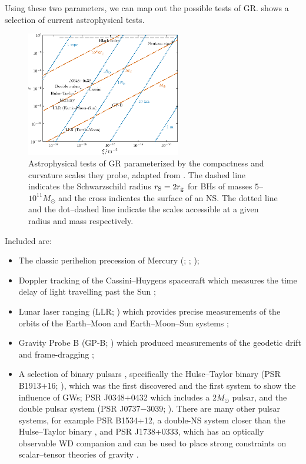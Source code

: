 Using these two parameters, we can map out the possible tests of GR.  shows a selection of current astrophysical tests.
\begin{figure}
  \centering
  \includegraphics[width=0.6\textwidth]{./images/Fig_Psaltis_plot}
    \caption{Astrophysical tests of GR parameterized by the compactness and curvature scales they probe, adapted from \citet{Psaltis2008a}. The dashed line indicates the Schwarzschild radius $r_\mathrm{S} = 2 r_\mathrm{g}$ for BHs of masses $5$--$10^{11} M_\odot$ and the cross indicates the surface of an NS. The dotted line and the dot--dashed line indicate the scales accessible at a given radius and mass respectively.}  
    \label{fig:Psaltis} 
\end{figure}
Included are:
\begin{itemize}
\item The classic perihelion precession of Mercury (\citealt[section 10.2]{Hobson2006}; \citealt[section 7.3]{Will1993}; \citealt{Pitjeva2013});
\item Doppler tracking of the Cassini--Huygens spacecraft \citep{Bertotti2003} which measures the time delay of light travelling past the Sun \citep[section 7.2]{Will1993};
\item Lunar laser ranging (LLR; \citealt{Bender1973,Williams2012}) which provides precise measurements of the orbits of the Earth--Moon and Earth--Moon--Sun systems \citep[section 8.1]{Will1993};
\item Gravity Probe B (GP-B; \citealt{Everitt2009,Everitt2011}) which produced measurements of the geodetic drift and frame-dragging \citep[section 9.1]{Will1993};
\item A selection of binary pulsars \citep{Taylor1993,Stairs2003}, specifically the Hulse--Taylor binary (PSR B1913$+$16; \citealt{Hulse1975,Weisberg2010}), which was the first discovered and the first system to show the influence of GWs; PSR J0348$+$0432 \citep{Antoniadis2013} which includes a $2 M_\odot$ pulsar, and the double pulsar system (PSR J0737$-$3039; \citealt{Breton2008,Kramer2008}). There are many other pulsar systems, for example PSR B1534+12, a double-NS system closer than the Hulse--Taylor binary \citep{Stairs2002}, and PSR J1738+0333, which has an optically observable WD companion \citep{Antoniadis2012} and can be used to place strong constraints on scalar--tensor theories of gravity \citep{Freire2012}.
\end{itemize}
